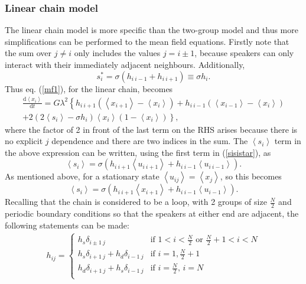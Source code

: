 \documentclass[12pt]{article}
\begin{document}
\subsubsection{Linear chain model}
The linear chain model is more specific than the two-group model and thus more simplifications can be performed to the mean field equations. Firstly note that the sum over $j \neq i$ only includes the values $j = i \pm 1$, because speakers can only interact with their immediately adjacent neighbours. Additionally,
\begin{equation}
s_i^* = \sigma (h_{i \ i-1} + h_{i \ i+1}) \equiv \sigma h_i.
\end{equation}
Thus eq. (\ref{mf1}), for the linear chain, becomes
\begin{multline}\label{dxidt}
\frac{\mathrm d \left\langle x_i \right\rangle}{\mathrm dt} = G\lambda^{2} \left\lbrace  h_{i \ i+1} \left( \left\langle x_{i+1} \right\rangle -  \left\langle x_i \right\rangle \right) + h_{i \ i-1} \left( \left\langle x_{i-1} \right\rangle -  \left\langle x_i \right\rangle \right) \right. \\ \left. + 2 \left( 2\left\langle s_i \right\rangle - \sigma h_i \right) \left\langle x_i \right\rangle \left(1- \left\langle x_i \right\rangle \right) \right\rbrace,
\end{multline}
where the factor of 2 in front of the last term on the RHS arises because there is no explicit $j$ dependence and there are two indices in the sum. The $\left\langle s_i \right\rangle$ term in the above expression can be written, using the first term in (\ref{sisistar}), as
\begin{equation}
\left\langle s_i \right\rangle  =\sigma \left( h_{i \ i+1} \left\langle u_{i \ i+1} \right\rangle + h_{i \ i-1} \left\langle u_{i \ i-1}\right\rangle \right).
\end{equation}
As mentioned above, for a stationary state $\left\langle u_{ij} \right\rangle = \left\langle x_{j} \right\rangle$, so this becomes
\begin{equation}\label{si}
\left\langle s_i \right\rangle = \sigma \left( h_{i \ i+1} \left\langle x_{i+1} \right\rangle + h_{i \ i-1} \left\langle u_{i-1}\right\rangle \right).
\end{equation}
Recalling that the chain is considered to be a loop, with 2 groups of size $\frac{N}{2}$ and periodic boundary conditions so that the speakers at either end are adjacent, the following statements can be made:
\begin{align}\label{hi3}
h_{i j} = \begin{cases}
h_s \delta_{i \pm 1 \ j} & \text{if $1 < i < \frac{N}{2}$ or $\frac{N}{2}+1 < i < N$} \\
h_s \delta_{i+1 \ j} + h_d \delta_{i-1 \ j} & \text{if $i =1, \frac{N}{2}+1$} \\
h_d \delta_{i+1 \ j} + h_s \delta_{i-1 \ j} & \text{if $i = \frac{N}{2}$, $i = N$} \\
\end{cases}
\end{align}
\end{document}
